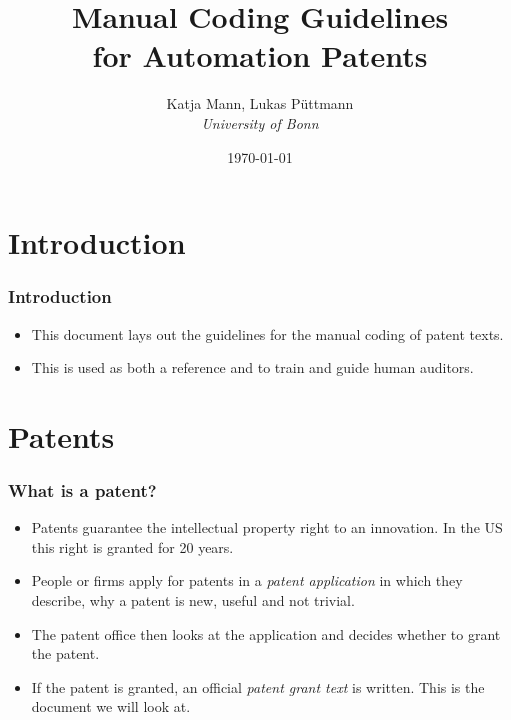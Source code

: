 \documentclass[10pt]{beamer}
\title {\textbf{Manual Coding Guidelines\\[0.15cm]
for Automation Patents}}
\author{
Katja Mann, Lukas P\"uttmann \\  
\textit{University of Bonn}}
\date{\today}
\begin{document}
\begin{frame}
\titlepage
\end{frame}


\section{Introduction}
\setcounter{subsection}{1} %

\begin{frame}\frametitle{Introduction}
	\begin{itemize}	
		\item This document lays out the guidelines for the manual coding of patent texts.
		\item This is used as both a reference and to train and guide human auditors.
	\end{itemize}
\end{frame}


\section{Patents}
\setcounter{subsection}{1} %

\begin{frame}\frametitle{What is a patent?}
	\begin{itemize}	
		\item Patents guarantee the intellectual property right to an innovation. In the US this right is granted for 20 years. 
		\item People or firms apply for patents in a \textit{patent application} in which they describe, why a patent is new, useful and not trivial.
		\item The patent office then looks at the application and decides whether to grant the patent.
		\item If the patent is granted, an official \textit{patent grant text} is written. This is the document we will look at.
	\end{itemize}
\end{frame}
\end{document}
